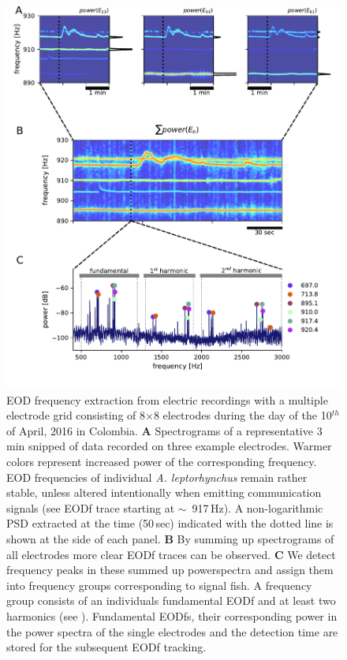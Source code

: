 \documentclass[11pt,pdftex]{article}
\newcommand{\figitem}[1]{\textsf{\bfseries\uppercase{#1}}\penalty10000 }
\newcommand{\lepto}{\textit{A. leptorhynchus}}
\begin{document}
\begin{figure}[p]
  \centerline{\includegraphics[width=.9\linewidth]{signal_extraction}}
  \caption{\label{signal_extraction} EOD frequency extraction from electric recordings   with a multiple electrode grid consisting of 8$\times$8 electrodes during the day of the 10$^{th}$ of April, 2016 in Colombia. \figitem{A} Spectrograms of a representative 3\,min snipped of data recorded on three example electrodes. Warmer colors represent increased power of the corresponding frequency. EOD frequencies of individual \lepto{} remain rather stable, unless altered intentionally when emitting communication signals (see EODf trace starting at $\sim$~917\,Hz). A non-logarithmic PSD extracted at the time (50\,sec) indicated with the dotted line is shown at the side of each panel. \figitem{B} By summing up spectrograms of all electrodes more clear EODf traces can be observed. \figitem{C} We detect frequency peaks in these summed up powerspectra and assign them into frequency groups corresponding to signal fish. A frequency group consists of an individuals fundamental EODf and at least two harmonics (see \citealp{Henninger2020}). Fundamental EODfs, their corresponding power in the power spectra of the single electrodes and the detection time are stored for the subsequent EODf tracking. } 
\end{figure}
\end{document}
